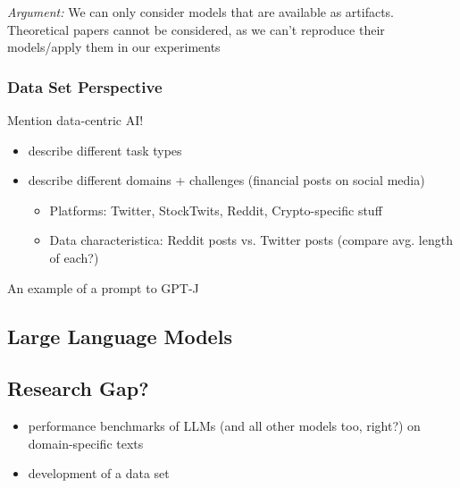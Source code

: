 \emph{Argument:} We can only consider models that are available as artifacts. Theoretical papers cannot be considered, as we can't reproduce their models/apply them in our experiments




\subsubsection{Data Set Perspective}
Mention data-centric AI!
\begin{itemize}[noitemsep]
	\item describe different task types
	\item describe different domains + challenges (financial posts on social media)
	\begin{itemize}[noitemsep]
		\item Platforms: Twitter, StockTwits, Reddit, Crypto-specific stuff
		\item Data characteristica: Reddit posts vs. Twitter posts (compare avg. length of each?)
\end{itemize}
\end{itemize}



An example of a prompt to GPT-J \cite{gpt-j}

\subsection{Large Language Models}

\subsection{Research Gap?}
\begin{itemize}[noitemsep]
	\item performance benchmarks of LLMs (and all other models too, right?) on domain-specific texts
	\item development of a data set 	
\end{itemize}

